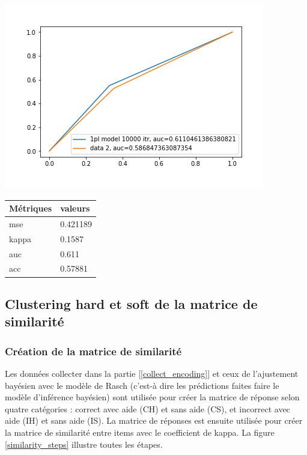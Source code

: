 \begin{minipage}{\textwidth}
	\begin{minipage}[b]{0.49\textwidth}
	\centering
	\includegraphics[width=\textwidth]{images/chapitre7/roc_auc.png}
\end{minipage}
\hfill
\begin{minipage}[b]{0.49\textwidth}
	\centering
	\begin{tabular}{|m{3cm}|m{3cm}|}
	\hline
	\rowcolor{blueforest}
	\color{white} \textbf{Métriques} & \color{white} \textbf{valeurs}  \\
	\hline\hline
	mse & 0.421189 \\ \hline
	kappa & 0.1587 \\ \hline
	auc & 0.611 \\ \hline
	acc & 0.57881 \\ \hline
	\end{tabular}
	\end{minipage}
\end{minipage}

\subsection{Clustering hard et soft de la matrice de similarité}

\subsubsection{Création de la matrice de similarité}
Les données collecter dans la partie [\ref{collect_encoding}] et ceux de l’ajustement bayésien avec le modèle de Rasch (c’est-à dire les prédictions faites faire le modèle d’inférence bayésien) sont utilisée pour créer la matrice de réponse selon quatre catégories : correct avec aide (CH) et sans aide (CS), et incorrect avec aide (IH) et sans aide (IS). La matrice de réponses est ensuite utilisée pour créer la matrice de similarité entre items avec le coefficient de kappa. La figure \ref{similarity_steps} illustre toutes les étapes. 

